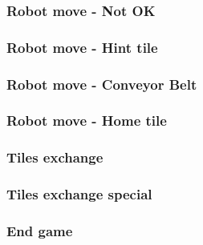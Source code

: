	\subsubsection{Robot move - Not OK}
	
	
	\subsubsection{Robot move - Hint tile}
	
	
	\subsubsection{Robot move - Conveyor Belt}
	
	
	\subsubsection{Robot move - Home tile}
	
	
	\subsubsection{Tiles exchange}
	
	
	\subsubsection{Tiles exchange special}
	
	
	\subsubsection{End game}
	
